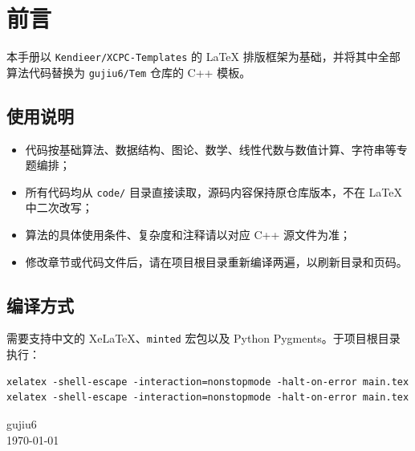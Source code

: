 \chapter*{前言}

本手册以 \texttt{Kendieer/XCPC-Templates} 的 LaTeX 排版框架为基础，并将其中全部算法代码替换为 \texttt{gujiu6/Tem} 仓库的 C++ 模板。

\section*{使用说明}
\begin{itemize}[leftmargin=2em]
  \item 代码按基础算法、数据结构、图论、数学、线性代数与数值计算、字符串等专题编排；
  \item 所有代码均从 \texttt{code/} 目录直接读取，源码内容保持原仓库版本，不在 LaTeX 中二次改写；
  \item 算法的具体使用条件、复杂度和注释请以对应 C++ 源文件为准；
  \item 修改章节或代码文件后，请在项目根目录重新编译两遍，以刷新目录和页码。
\end{itemize}

\section*{编译方式}
需要支持中文的 XeLaTeX、\texttt{minted} 宏包以及 Python Pygments。于项目根目录执行：
\begin{verbatim}
xelatex -shell-escape -interaction=nonstopmode -halt-on-error main.tex
xelatex -shell-escape -interaction=nonstopmode -halt-on-error main.tex
\end{verbatim}

\begin{flushright}
    gujiu6\\
    \today
\end{flushright}
